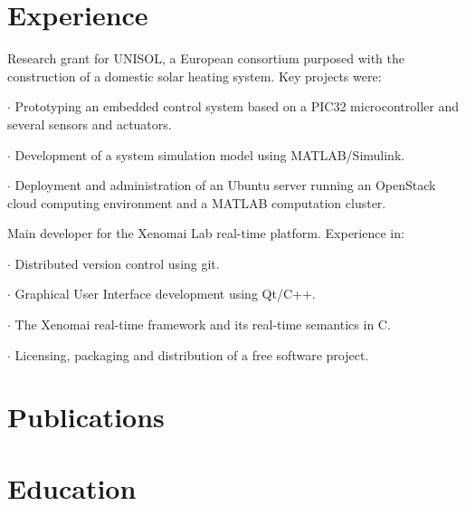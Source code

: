 \section*{Experience}

{
Research grant for UNISOL, a European consortium purposed with the construction
of a domestic solar heating system. Key projects were:

 $\cdot$  Prototyping an embedded control system based on a PIC32 microcontroller and
several sensors and actuators.

 $\cdot$  Development of a system simulation model using MATLAB/Simulink.

 $\cdot$  Deployment and administration of an Ubuntu server running an
OpenStack cloud computing environment and a MATLAB computation cluster.
}

\vspace{\baselineskip}
{
Main developer for the Xenomai Lab real-time platform. Experience in:

 $\cdot$ Distributed version control using git.

 $\cdot$ Graphical User Interface development using Qt/C++.

 $\cdot$ The Xenomai real-time framework and its real-time semantics in C.

 $\cdot$ Licensing, packaging and distribution of a free software project.

}

\section*{Publications}


\section*{Education}

